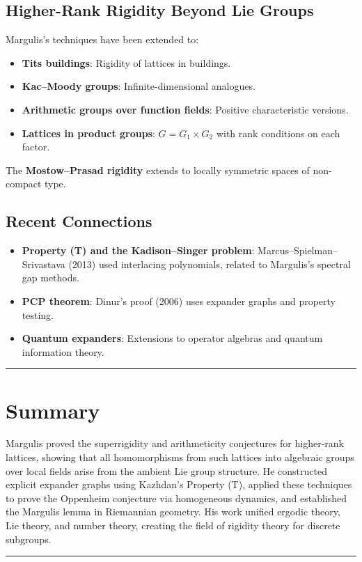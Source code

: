 \subsection{Higher-Rank Rigidity Beyond Lie Groups}

Margulis's techniques have been extended to:

\begin{itemize}
\item \textbf{Tits buildings}: Rigidity of lattices in buildings.
\item \textbf{Kac--Moody groups}: Infinite-dimensional analogues.
\item \textbf{Arithmetic groups over function fields}: Positive
characteristic versions.
\item \textbf{Lattices in product groups}: $G = G_1 \times G_2$ with
rank conditions on each factor.
\end{itemize}

The \textbf{Mostow--Prasad rigidity} extends to locally symmetric
spaces of non-compact type.

\subsection{Recent Connections}

\begin{itemize}
\item \textbf{Property (T) and the Kadison--Singer problem}:
Marcus--Spielman--Srivastava (2013) used interlacing polynomials,
related to Margulis's spectral gap methods.
\item \textbf{PCP theorem}: Dinur's proof (2006) uses expander
graphs and property testing.
\item \textbf{Quantum expanders}: Extensions to operator algebras
and quantum information theory.
\end{itemize}

\begin{center}\rule{0.5\linewidth}{0.5pt}\end{center}

\section*{Summary}

Margulis proved the superrigidity and arithmeticity conjectures for
higher-rank lattices, showing that all homomorphisms from such lattices
into algebraic groups over local fields arise from the ambient Lie
group structure. He constructed explicit expander graphs using
Kazhdan's Property (T), applied these techniques to prove the
Oppenheim conjecture via homogeneous dynamics, and established the
Margulis lemma in Riemannian geometry. His work unified ergodic theory,
Lie theory, and number theory, creating the field of rigidity theory
for discrete subgroups.

\begin{center}\rule{0.5\linewidth}{0.5pt}\end{center}
